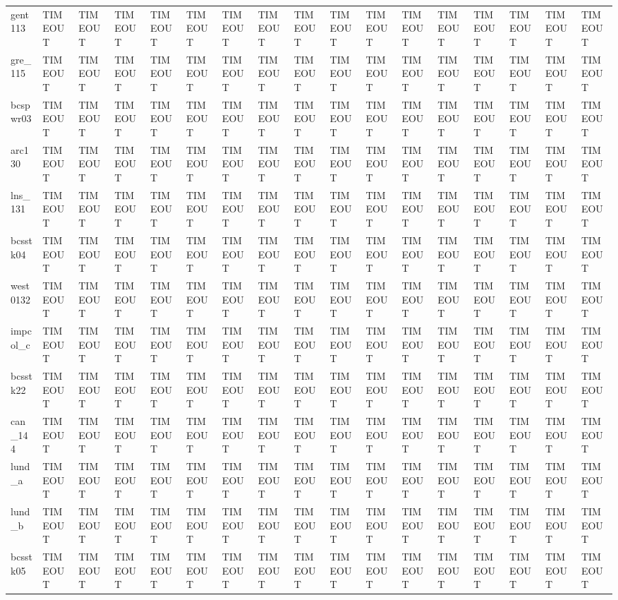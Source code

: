 \begin{tabular}{lllllllllllllllll}
gent113 & TIMEOUT & TIMEOUT & TIMEOUT & TIMEOUT & TIMEOUT & TIMEOUT & TIMEOUT & TIMEOUT & TIMEOUT & TIMEOUT & TIMEOUT & TIMEOUT & TIMEOUT & TIMEOUT & TIMEOUT & TIMEOUT \\
gre\_115 & TIMEOUT & TIMEOUT & TIMEOUT & TIMEOUT & TIMEOUT & TIMEOUT & TIMEOUT & TIMEOUT & TIMEOUT & TIMEOUT & TIMEOUT & TIMEOUT & TIMEOUT & TIMEOUT & TIMEOUT & TIMEOUT \\
bcspwr03 & TIMEOUT & TIMEOUT & TIMEOUT & TIMEOUT & TIMEOUT & TIMEOUT & TIMEOUT & TIMEOUT & TIMEOUT & TIMEOUT & TIMEOUT & TIMEOUT & TIMEOUT & TIMEOUT & TIMEOUT & TIMEOUT \\
arc130 & TIMEOUT & TIMEOUT & TIMEOUT & TIMEOUT & TIMEOUT & TIMEOUT & TIMEOUT & TIMEOUT & TIMEOUT & TIMEOUT & TIMEOUT & TIMEOUT & TIMEOUT & TIMEOUT & TIMEOUT & TIMEOUT \\
lns\_131 & TIMEOUT & TIMEOUT & TIMEOUT & TIMEOUT & TIMEOUT & TIMEOUT & TIMEOUT & TIMEOUT & TIMEOUT & TIMEOUT & TIMEOUT & TIMEOUT & TIMEOUT & TIMEOUT & TIMEOUT & TIMEOUT \\
bcsstk04 & TIMEOUT & TIMEOUT & TIMEOUT & TIMEOUT & TIMEOUT & TIMEOUT & TIMEOUT & TIMEOUT & TIMEOUT & TIMEOUT & TIMEOUT & TIMEOUT & TIMEOUT & TIMEOUT & TIMEOUT & TIMEOUT \\
west0132 & TIMEOUT & TIMEOUT & TIMEOUT & TIMEOUT & TIMEOUT & TIMEOUT & TIMEOUT & TIMEOUT & TIMEOUT & TIMEOUT & TIMEOUT & TIMEOUT & TIMEOUT & TIMEOUT & TIMEOUT & TIMEOUT \\
impcol\_c & TIMEOUT & TIMEOUT & TIMEOUT & TIMEOUT & TIMEOUT & TIMEOUT & TIMEOUT & TIMEOUT & TIMEOUT & TIMEOUT & TIMEOUT & TIMEOUT & TIMEOUT & TIMEOUT & TIMEOUT & TIMEOUT \\
bcsstk22 & TIMEOUT & TIMEOUT & TIMEOUT & TIMEOUT & TIMEOUT & TIMEOUT & TIMEOUT & TIMEOUT & TIMEOUT & TIMEOUT & TIMEOUT & TIMEOUT & TIMEOUT & TIMEOUT & TIMEOUT & TIMEOUT \\
can\_144 & TIMEOUT & TIMEOUT & TIMEOUT & TIMEOUT & TIMEOUT & TIMEOUT & TIMEOUT & TIMEOUT & TIMEOUT & TIMEOUT & TIMEOUT & TIMEOUT & TIMEOUT & TIMEOUT & TIMEOUT & TIMEOUT \\
lund\_a & TIMEOUT & TIMEOUT & TIMEOUT & TIMEOUT & TIMEOUT & TIMEOUT & TIMEOUT & TIMEOUT & TIMEOUT & TIMEOUT & TIMEOUT & TIMEOUT & TIMEOUT & TIMEOUT & TIMEOUT & TIMEOUT \\
lund\_b & TIMEOUT & TIMEOUT & TIMEOUT & TIMEOUT & TIMEOUT & TIMEOUT & TIMEOUT & TIMEOUT & TIMEOUT & TIMEOUT & TIMEOUT & TIMEOUT & TIMEOUT & TIMEOUT & TIMEOUT & TIMEOUT \\
bcsstk05 & TIMEOUT & TIMEOUT & TIMEOUT & TIMEOUT & TIMEOUT & TIMEOUT & TIMEOUT & TIMEOUT & TIMEOUT & TIMEOUT & TIMEOUT & TIMEOUT & TIMEOUT & TIMEOUT & TIMEOUT & TIMEOUT \\

\end{tabular}

